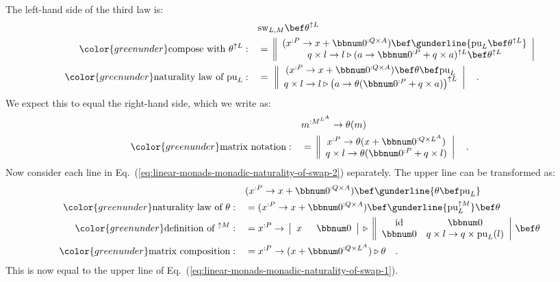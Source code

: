 The left-hand side of the third law is:
\begin{align}
 & \text{sw}_{L,M}\bef\theta^{\uparrow L}\nonumber \\
{\color{greenunder}\text{compose with }\theta^{\uparrow L}:}\quad & =\,\left\Vert \begin{array}{c}
(x^{:P}\rightarrow x+\bbnum 0^{:Q\times A})\bef\gunderline{\text{pu}_{L}\bef\theta^{\uparrow L}}\\
q\times l\rightarrow l\triangleright(a\rightarrow\bbnum 0^{:P}+q\times a)^{\uparrow L}\bef\theta^{\uparrow L}
\end{array}\right|\nonumber \\
{\color{greenunder}\text{naturality law of }\text{pu}_{L}:}\quad & =\,\,\left\Vert \begin{array}{c}
(x^{:P}\rightarrow x+\bbnum 0^{:Q\times A})\bef\theta\bef\text{pu}_{L}\\
q\times l\rightarrow l\triangleright\big(a\rightarrow\theta(\bbnum 0^{:P}+q\times a)\big)^{\uparrow L}
\end{array}\right|\quad.\label{eq:linear-monads-monadic-naturality-of-swap-2}
\end{align}
We expect this to equal the right-hand side, which we write as:
\begin{align}
 & m^{:M^{L^{A}}}\rightarrow\theta(m)\nonumber \\
{\color{greenunder}\text{matrix notation}:}\quad & =\,\left\Vert \begin{array}{c}
x^{:P}\rightarrow\theta(x+\bbnum 0^{:Q\times L^{A}})\\
q\times l\rightarrow\theta(\bbnum 0^{:P}+q\times l)
\end{array}\right|\quad.\label{eq:linear-monads-monadic-naturality-of-swap-1}
\end{align}
Now consider each line in Eq.~(\ref{eq:linear-monads-monadic-naturality-of-swap-2})
separately. The upper line can be transformed as:
\begin{align*}
 & (x^{:P}\rightarrow x+\bbnum 0^{:Q\times A})\bef\gunderline{\theta\bef\text{pu}_{L}}\\
{\color{greenunder}\text{naturality law of }\theta:}\quad & =(x^{:P}\rightarrow x+\bbnum 0^{:Q\times A})\bef\gunderline{\text{pu}_{L}^{\uparrow M}}\bef\theta\\
{\color{greenunder}\text{definition of }^{\uparrow M}:}\quad & =x^{:P}\rightarrow\,\left|\begin{array}{cc}
x\enskip & \bbnum 0\end{array}\right|\,\triangleright\,\left\Vert \begin{array}{cc}
\text{id} & \bbnum 0\\
\bbnum 0 & q\times l\rightarrow q\times\text{pu}_{L}(l)
\end{array}\right|\,\bef\theta\\
{\color{greenunder}\text{matrix composition}:}\quad & =x^{:P}\rightarrow(x+\bbnum 0^{:Q\times L^{A}})\triangleright\theta\quad.
\end{align*}
This is now equal to the upper line of Eq.~(\ref{eq:linear-monads-monadic-naturality-of-swap-1}).

